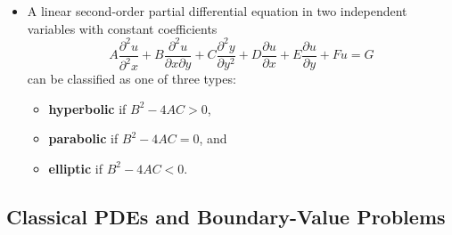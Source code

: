 \documentclass{article}
\begin{document}
\begin{itemize}
  \item A linear second-order partial differential equation in two independent variables with constant coefficients \[A \frac{\partial^2 u}{\partial^2 x} + B \frac{\partial^2 u}{\partial x \partial y} + C \frac{\partial^2 y}{\partial y^2} + D \frac{\partial u}{\partial x} + E \frac{\partial u}{\partial y} + F u = G\] can be classified as one of three types:

        \begin{itemize}
          \item \textbf{hyperbolic} if $B^2 - 4 A C > 0$,

          \item \textbf{parabolic} if $B^2 - 4 A C = 0$, and

          \item \textbf{elliptic} if $B^2 - 4 A C < 0$.
        \end{itemize}
\end{itemize}

\subsection{Classical PDEs and Boundary-Value Problems}
\end{document}
